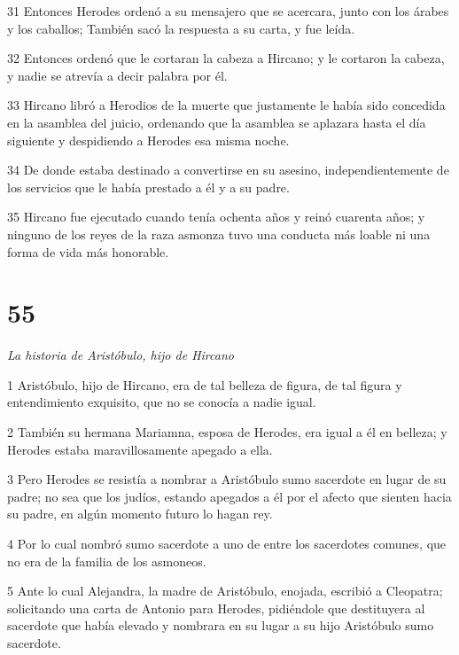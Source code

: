 \par 31 Entonces Herodes ordenó a su mensajero que se acercara, junto con los árabes y los caballos; También sacó la respuesta a su carta, y fue leída.

\par 32 Entonces ordenó que le cortaran la cabeza a Hircano; y le cortaron la cabeza, y nadie se atrevía a decir palabra por él.

\par 33 Hircano libró a Herodios de la muerte que justamente le había sido concedida en la asamblea del juicio, ordenando que la asamblea se aplazara hasta el día siguiente y despidiendo a Herodes esa misma noche.

\par 34 De donde estaba destinado a convertirse en su asesino, independientemente de los servicios que le había prestado a él y a su padre.

\par 35 Hircano fue ejecutado cuando tenía ochenta años y reinó cuarenta años; y ninguno de los reyes de la raza asmonza tuvo una conducta más loable ni una forma de vida más honorable.

\chapter{55}

\par \textit{La historia de Aristóbulo, hijo de Hircano}

\par 1 Aristóbulo, hijo de Hircano, era de tal belleza de figura, de tal figura y entendimiento exquisito, que no se conocía a nadie igual.

\par 2 También su hermana Mariamna, esposa de Herodes, era igual a él en belleza; y Herodes estaba maravillosamente apegado a ella.

\par 3 Pero Herodes se resistía a nombrar a Aristóbulo sumo sacerdote en lugar de su padre; no sea que los judíos, estando apegados a él por el afecto que sienten hacia su padre, en algún momento futuro lo hagan rey.

\par 4 Por lo cual nombró sumo sacerdote a uno de entre los sacerdotes comunes, que no era de la familia de los asmoneos.

\par 5 Ante lo cual Alejandra, la madre de Aristóbulo, enojada, escribió a Cleopatra; solicitando una carta de Antonio para Herodes, pidiéndole que destituyera al sacerdote que había elevado y nombrara en su lugar a su hijo Aristóbulo sumo sacerdote.


